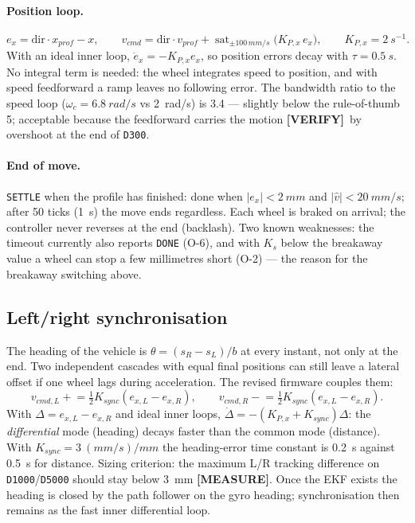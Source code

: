 \documentclass[11pt,a4paper]{article}
\newcommand{\mk}[2]{\textsf{\scriptsize\bfseries\colorbox{#1bg}{\color{#1}[#2]}}}
\newcommand{\MEASURE}{\mk{warn}{MEASURE}}
\newcommand{\VERIFY}{\mk{cold}{VERIFY}}
\newcommand{\code}[1]{\texttt{\small #1}}
\newcommand{\sat}{\operatorname{sat}}
\begin{document}
\paragraph{Position loop.}
\begin{equation}
e_x=\text{dir}\cdot x_{prof}-x,\qquad
v_{cmd}=\text{dir}\cdot v_{prof}+\sat_{\pm100\,mm/s}\bigl(K_{P,x}\,e_x\bigr),\qquad K_{P,x}=\qty{2}{s^{-1}}.
\end{equation}
With an ideal inner loop, $\dot e_x=-K_{P,x}e_x$, so position errors decay with
$\tau=\qty{0.5}{s}$. No integral term is needed: the wheel integrates speed to
position, and with speed feedforward a ramp leaves no following error. The
bandwidth ratio to the speed loop ($\omega_c=\qty{6.8}{rad/s}$ vs
\qty{2}{rad/s}) is 3.4 --- slightly below the rule-of-thumb 5; acceptable because
the feedforward carries the motion \VERIFY\ by overshoot at the end of
\code{D300}.

\paragraph{End of move.} \code{SETTLE} when the profile has finished: done when
$|e_x|<\qty{2}{mm}$ and $|\hat v|<\qty{20}{mm/s}$; after 50 ticks (\qty{1}{s})
the move ends regardless. Each wheel is braked on arrival; the controller never
reverses at the end (backlash). Two known weaknesses: the timeout currently also
reports \code{DONE} (O-6), and with $K_s$ below the breakaway value a wheel can stop
a few millimetres short (O-2) --- the reason for the breakaway switching above.

\subsection{Left/right synchronisation}\label{sec:sync}

The heading of the vehicle is $\theta=(s_R-s_L)/b$ at every instant, not only
at the end. Two independent cascades with equal final positions can still leave
a lateral offset if one wheel lags during acceleration. The revised firmware
couples them:
\begin{equation}
v_{cmd,L}\mathrel{+}=\tfrac12K_{sync}(e_{x,L}-e_{x,R}),\qquad
v_{cmd,R}\mathrel{-}=\tfrac12K_{sync}(e_{x,L}-e_{x,R}).
\end{equation}
With $\Delta=e_{x,L}-e_{x,R}$ and ideal inner loops,
$\dot\Delta=-(K_{P,x}+K_{sync})\Delta$: the \emph{differential} mode (heading)
decays faster than the common mode (distance). With $K_{sync}=\qty{3}{(mm/s)/mm}$ the
heading-error time constant is \qty{0.2}{s} against \qty{0.5}{s} for distance.
Sizing criterion: the maximum L/R tracking difference on \code{D1000}/\code{D5000}
should stay below \qty{3}{mm} \MEASURE. Once the EKF exists the heading is
closed by the path follower on the gyro heading; synchronisation then remains as
the fast inner differential loop.
\end{document}
